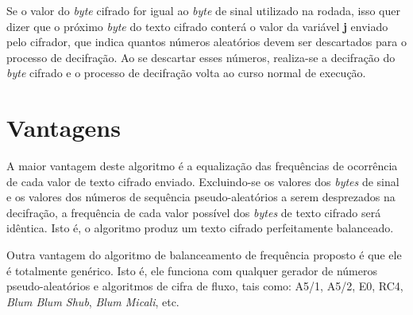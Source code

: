 Se o valor do \textit{byte} cifrado for igual ao \textit{byte} de sinal utilizado na rodada, isso quer dizer que o próximo \textit{byte} do texto cifrado conterá o valor da variável \textbf{j} enviado pelo cifrador, que indica quantos números aleatórios devem ser descartados para o processo de decifração. Ao se descartar esses números, realiza-se a decifração do \textit{byte} cifrado e o processo de decifração volta ao curso normal de execução.

\section{Vantagens}

A maior vantagem deste algoritmo é a equalização das frequências de ocorrência de cada valor de texto cifrado enviado. Excluindo-se os valores dos \textit{bytes} de sinal e os valores dos números de sequência pseudo-aleatórios a serem desprezados na decifração, a frequência de cada valor possível dos \textit{bytes} de texto cifrado será idêntica. Isto é, o algoritmo produz um texto cifrado perfeitamente balanceado.

Outra vantagem do algoritmo de balanceamento de frequência proposto é que ele é totalmente genérico.  Isto é, ele funciona com qualquer gerador de números pseudo-aleatórios e algoritmos de cifra de fluxo, tais como: A5/1, A5/2, E0, RC4, \textit{Blum Blum Shub}, \textit{Blum Micali}, etc.
